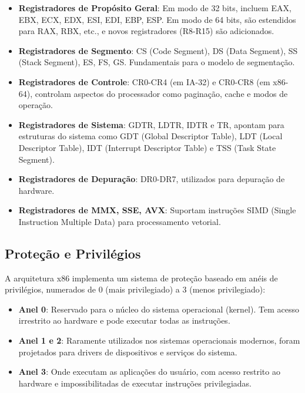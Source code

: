 \begin{itemize}
    \item \textbf{Registradores de Propósito Geral}: Em modo de 32 bits, incluem EAX, EBX, ECX, EDX, ESI, EDI, EBP, ESP. Em modo de 64 bits, são estendidos para RAX, RBX, etc., e novos registradores (R8-R15) são adicionados.

    \item \textbf{Registradores de Segmento}: CS (Code Segment), DS (Data Segment), SS (Stack Segment), ES, FS, GS. Fundamentais para o modelo de segmentação.

    \item \textbf{Registradores de Controle}: CR0-CR4 (em IA-32) e CR0-CR8 (em x86-64), controlam aspectos do processador como paginação, cache e modos de operação.

    \item \textbf{Registradores de Sistema}: GDTR, LDTR, IDTR e TR, apontam para estruturas do sistema como GDT (Global Descriptor Table), LDT (Local Descriptor Table), IDT (Interrupt Descriptor Table) e TSS (Task State Segment).

    \item \textbf{Registradores de Depuração}: DR0-DR7, utilizados para depuração de hardware.

    \item \textbf{Registradores de MMX, SSE, AVX}: Suportam instruções SIMD (Single Instruction Multiple Data) para processamento vetorial.
\end{itemize}

\subsection{Proteção e Privilégios}
\label{subsec:protecao}

A arquitetura x86 implementa um sistema de proteção baseado em anéis de privilégios, numerados de 0 (mais privilegiado) a 3 (menos privilegiado):

\begin{itemize}
    \item \textbf{Anel 0}: Reservado para o núcleo do sistema operacional (kernel). Tem acesso irrestrito ao hardware e pode executar todas as instruções.

    \item \textbf{Anel 1 e 2}: Raramente utilizados nos sistemas operacionais modernos, foram projetados para drivers de dispositivos e serviços do sistema.

    \item \textbf{Anel 3}: Onde executam as aplicações do usuário, com acesso restrito ao hardware e impossibilitadas de executar instruções privilegiadas.
\end{itemize}

